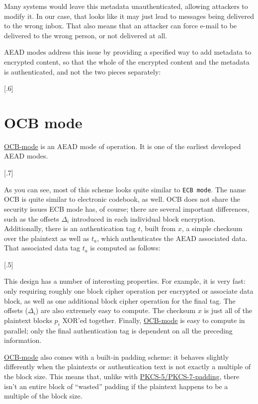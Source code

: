 \documentclass[11pt,ebook,table,dvipsnames]{memoir}
\begin{document}
Many systems would leave this metadata unauthenticated, allowing
attackers to modify it. In our case, that looks like it may just lead
to messages being delivered to the wrong inbox. That also means that
an attacker can force e-mail to be delivered to the wrong person, or
not delivered at all.

\Gls{AEAD} modes address this issue by providing a specified way to
add metadata to encrypted content, so that the whole of the encrypted
content and the metadata is authenticated, and not the two pieces
separately:

[.6]
\section{\label{OCB-mode}OCB mode}
\label{sec-2-7-8}

\hyperref[OCB mode]{OCB-mode} is an \gls{AEAD} mode of operation. It is one of the earliest
developed \glspl{AEAD mode}.

[.7]

As you can see, most of this scheme looks quite similar to \texttt{ECB mode}.
The name \gls{OCB} is quite similar to electronic codebook, as well.
OCB does not share the security issues ECB mode has, of course; there
are several important differences, such as the offsets $\Delta_i$
introduced in each individual block encryption. Additionally, there is
an authentication tag $t$, built from $x$, a simple checksum over the
plaintext as well as $t_a$, which authenticates the \gls{AEAD}
associated data. That associated data tag $t_a$ is computed as
follows:

[.5]

This design has a number of interesting properties. For example, it is
very fast: only requiring roughly one block cipher operation per
encrypted or associate data block, as well as one additional block
cipher operation for the final tag. The offsets ($\Delta_i$) are also
extremely easy to compute. The checksum $x$ is just all of the
plaintext blocks $p_i$ XOR'ed together. Finally, \hyperref[OCB mode]{OCB-mode} is easy to
compute in parallel; only the final authentication tag is dependent on
all the preceding information.

\hyperref[OCB mode]{OCB-mode} also comes with a built-in padding scheme: it behaves
slightly differently when the plaintexts or authentication text is not
exactly a multiple of the block size. This means that, unlike with
\hyperref[PKCS\#5/PKCS\#7 padding]{PKCS-5/PKCS-7-padding}, there isn't an entire block of \enquote{wasted} padding
if the plaintext happens to be a multiple of the block size.
\end{document}
